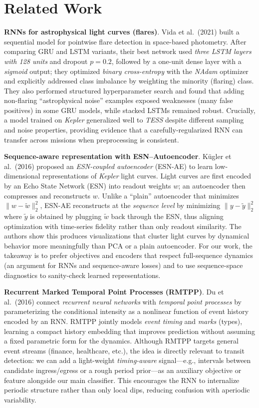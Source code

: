 \documentclass[letterpaper]{article}
\begin{document}
\section{Related Work}
\textbf{RNNs for astrophysical light curves (flares)}. Vida et al.\ (2021) built a sequential model for pointwise flare detection in space-based photometry. 
After comparing GRU and LSTM variants, their best network used \emph{three LSTM layers with 128 units} and dropout $p{=}0.2$, followed by a one-unit dense layer with a \emph{sigmoid} output; they optimized \emph{binary cross-entropy} with the \emph{NAdam} optimizer and explicitly addressed class imbalance by weighting the minority (flaring) class. 
They also performed structured hyperparameter search and found that adding non-flaring ``astrophysical noise'' examples exposed weaknesses (many false positives) in some GRU models, while stacked LSTMs remained robust. 
Crucially, a model trained on \emph{Kepler} generalized well to \emph{TESS} despite different sampling and noise properties, providing evidence that a carefully-regularized RNN can transfer across missions when preprocessing is consistent. 

\noindent\textbf{Sequence-aware representation with ESN--Autoencoder}. 
K\"{u}gler et al.\ (2016) proposed an \emph{ESN-coupled autoencoder} (ESN-AE) to learn low-dimensional representations of \emph{Kepler} light curves. 
Light curves are first encoded by an Echo State Network (ESN) into readout weights $w$; an autoencoder then compresses and reconstructs $w$. 
Unlike a ``plain'' autoencoder that minimizes $\lVert w-\tilde{w}\rVert_2^2$, ESN-AE reconstructs at the \emph{sequence level} by minimizing $\lVert y-\tilde{y}\rVert_2^2$ where $\tilde{y}$ is obtained by plugging $\tilde{w}$ back through the ESN, thus aligning optimization with time-series fidelity rather than only readout similarity. 
The authors show this produces visualizations that cluster light curves by dynamical behavior more meaningfully than PCA or a plain autoencoder. 
For our work, the takeaway is to prefer objectives and encoders that respect full-sequence dynamics (an argument for RNNs and sequence-aware losses) and to use sequence-space diagnostics to sanity-check learned representations. 

\noindent\textbf{Recurrent Marked Temporal Point Processes (RMTPP)}. 
Du et al.\ (2016) connect \emph{recurrent neural networks} with \emph{temporal point processes} by parameterizing the conditional intensity as a nonlinear function of event history encoded by an RNN. 
RMTPP jointly models \emph{event timing} and \emph{marks} (types), learning a compact history embedding that improves prediction without assuming a fixed parametric form for the dynamics. 
Although RMTPP targets general event streams (finance, healthcare, etc.), the idea is directly relevant to transit detection: we can add a light-weight \emph{timing-aware} signal---e.g., intervals between candidate ingress/egress or a rough period prior---as an auxiliary objective or feature alongside our main classifier. 
This encourages the RNN to internalize periodic structure rather than only local dips, reducing confusion with aperiodic variability. 
\end{document}
